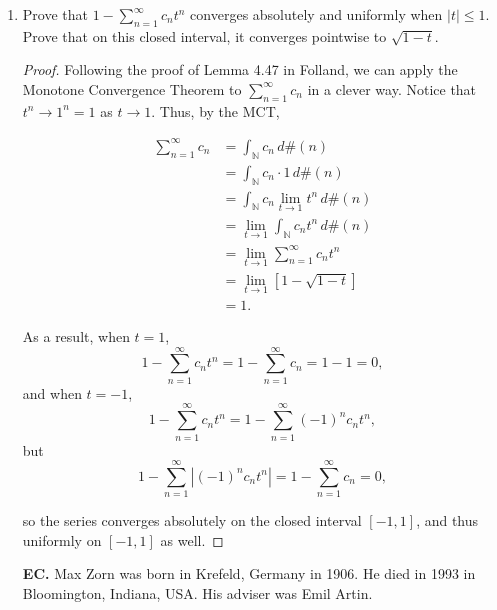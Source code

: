 \documentclass[11pt,oneside,english]{amsart}
\theoremstyle{definition}
\newcommand{\lom}[2]{\lim_{{#1}\rightarrow{#2}}}
\newcommand{\MB}[1]{\mathbb{#1}}
\begin{document}
\begin{enumerate}
\begin{proof}
By the ratio test, the series above will converge absolutely whenever $|t|<1$, and thus on compact subsets of $(-1,1)$, as well as the differentiated series $-\sum_{j=1}^nnc_nt^{n-1}$. Moreover, the coefficients $c_n$ were computed directly above from the formula for a Taylor series applied to the function $f(t)=\sqrt{1-t}$, so, since it converges pointwise on $(-1,1)$, it converges pointwise to $\sqrt{1-t}$.
\end{proof}

\pagebreak

\item Prove that $\displaystyle 1-\sum_{n=1}^\infty c_nt^n$ converges absolutely and uniformly when $|t|\leq1$. Prove that on this closed interval, it converges pointwise to $\sqrt{1-t}$.

\begin{proof}
Following the proof of Lemma 4.47 in Folland, we can apply the Monotone Convergence Theorem to $\sum_{n=1}^\infty c_n$ in a clever way. Notice that $t^n\rightarrow1^n=1$ as $t\rightarrow1$. Thus, by the MCT,

\begin{align*}
\sum_{n=1}^\infty c_n&=\int_{\MB{N}}c_n\,d\#(n)\\[2mm]
&=\int_{\MB{N}}c_n\cdot1\,d\#(n)\\[2mm]
&=\int_{\MB{N}}c_n\lom{t}{1}t^n\,d\#(n)\\[2mm]
&=\lom{t}{1}\int_{\MB{N}}c_nt^n\,d\#(n)\\[2mm]
&=\lom{t}{1}\sum_{n=1}^\infty c_n t^n\\[2mm]
&=\lom{t}{1}\left[1-\sqrt{1-t}\right]\\[2mm]
&=1.
\end{align*}

As a result, when $t=1$,
\[
1-\sum_{n=1}^\infty c_nt^n=1-\sum_{n=1}^\infty c_n=1-1=0,
\]
and when $t=-1$, 
\[
1-\sum_{n=1}^\infty c_nt^n=1-\sum_{n=1}^\infty (-1)^nc_nt^n,
\]
but
\[
1-\sum_{n=1}^\infty |(-1)^nc_nt^n|=1-\sum_{n=1}^\infty c_n=0,
\]

so the series converges absolutely on the closed interval $[-1,1]$, and thus uniformly on $[-1,1]$ as well.
\end{proof}



\item[\textbf{EC.}] Max Zorn was born in Krefeld, Germany in 1906. He died in 1993 in Bloomington, Indiana, USA. His adviser was Emil Artin.


\end{enumerate}
\end{document}
